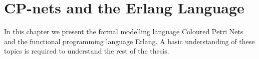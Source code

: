 \chapter{CP-nets and the Erlang Language}
\label{chap:background}

In this chapter we present the formal modelling language Coloured Petri Nets and the functional programming language Erlang. A basic understanding of these topics is required to understand the rest of the thesis.




